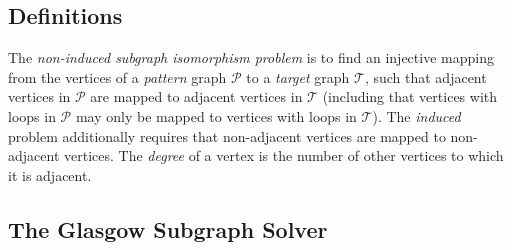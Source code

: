\documentclass[runningheads]{llncs}
\newcommand{\neighbourhood}{\operatorname{N}}
\newcommand{\vertexset}{\operatorname{V}}
\newcommand{\citet}[2]{#1\cite{#2}}
\begin{document}
\subsection{Definitions}


The \emph{non-induced subgraph isomorphism problem} is to find an injective mapping from the
vertices of a \emph{pattern} graph $\mathcal{P}$ to a \emph{target} graph $\mathcal{T}$, such that
adjacent vertices in $\mathcal{P}$ are mapped to adjacent vertices in $\mathcal{T}$ (including that
vertices with loops in $\mathcal{P}$ may only be mapped to vertices with loops in $\mathcal{T}$).
The \emph{induced} problem additionally requires that non-adjacent vertices are mapped to
non-adjacent vertices. The \emph{degree} of a vertex is the number of other vertices to which it is
adjacent.


\subsection{The Glasgow Subgraph Solver}
\end{document}
